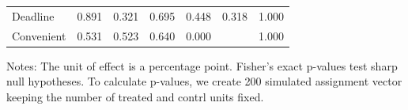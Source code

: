 \documentclass[
    a4paper
]{article}
\begin{document}
\begin{table}
\begin{threeparttable}
\begin{tabular}[t]{lcccccc}
\hspace{1em}Deadline & 0.891 & 0.321 & 0.695 & 0.448 & 0.318 & 1.000\\
\hspace{1em}Convenient & 0.531 & 0.523 & 0.640 & 0.000 &  & 1.000\\
\bottomrule
\end{tabular}
\begin{tablenotes}
\item Notes: The unit of effect is a percentage point. Fisher's exact p-values test sharp null hypotheses. To calculate p-values, we create 200 simulated assignment vector keeping the number of treated and contrl units fixed.
\end{tablenotes}
\end{threeparttable}
\end{table}
\end{document}
